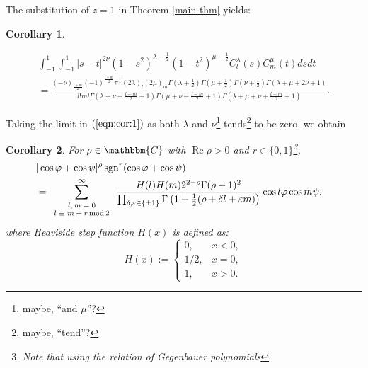 \documentclass{svjour3}
\newcommand{\assign}{:=}
\newcommand{\tmdummy}{$\mbox{}$}
\newcommand{\tmop}[1]{\ensuremath{\operatorname{#1}}}
\newcommand{\tmscript}[1]{\text{\scriptsize{$#1$}}}
\newtheorem{corollary}{Corollary}
{\theorembodyfont{\rmfamily}\newtheorem{example}{Example}}
\begin{document}
The substitution of $z = 1$ in Theorem \ref{main-thm} yields:

\begin{corollary}
  \label{cor:1}{\tmdummy}
  
  \begin{eqnarray}
    & \int_{- 1}^1 \int_{- 1}^1 | s - t |^{2 \nu} (1 - s^2)^{\lambda -
    \frac{1}{2}} (1 - t^2)^{\mu - \frac{1}{2}} C_l^{\lambda} (s) C_m^{\mu} (t)
    d s d t &  \nonumber\\
    & = \frac{(- \nu)_{\frac{l + m}{2}} (- 1)^{\frac{l - m}{2}}
    \pi^{\frac{1}{2}} (2 \lambda)_l (2 \mu)_m \Gamma \left( \lambda +
    \frac{1}{2} \right) \Gamma \left( \mu + \frac{1}{2} \right) \Gamma \left(
    \nu + \frac{1}{2} \right) \Gamma (\lambda + \mu + 2 \nu + 1)}{l!m! \Gamma
    \left( \lambda + \nu + \frac{l - m}{2} + 1 \right) \Gamma \left( \mu + \nu
    - \frac{l - m}{2} + 1 \right) \Gamma \left( \lambda + \mu + \nu + \frac{l
    + m}{2} + 1 \right)}  \label{eqn:cor:1} . & 
  \end{eqnarray}
\end{corollary}

Taking the limit in $(\ref{eqn:cor:1})$ as both $\lambda$ and
$\nu$\footnote{maybe, ``and $\mu$''?} tends\footnote{maybe, ``tend''?} to be
zero, we obtain

\begin{corollary}
  \label{cor:170599}For $\rho \in \mathbbm{C}$ with $\tmop{Re} \rho > 0$ and
  $r \in \{ 0, 1 \}$\footnote{Note that using the relation of Gegenbauer
  polynomials},
  \begin{eqnarray}
    & | \cos \varphi + \cos \psi |^{\rho} \tmop{sgn}^r (\cos \varphi + \cos
    \psi) &  \nonumber\\
    & = \sum_{\tmscript{\begin{array}{c}
      l, m = 0\\
      l \equiv m + r \tmop{mod} 2
    \end{array}}}^{\infty} \frac{H (l) H (m) 2^{2 - \rho} \Gamma (\rho +
    1)^2}{\prod_{\delta, \varepsilon \in \{ \pm 1 \}} \Gamma \left( 1 +
    \frac{1}{2} (\rho + \delta l + \varepsilon m) \right)} \cos l \varphi \cos
    m \psi . &  \nonumber
  \end{eqnarray}
  where Heaviside step function $H (x)$ is defined as:
  \[ H (x) \assign \left\{ \begin{array}{ll}
       0, & x < 0,\\
       1 / 2, & x = 0,\\
       1, & x > 0.
     \end{array} \right. \]
\end{corollary}
\end{document}
